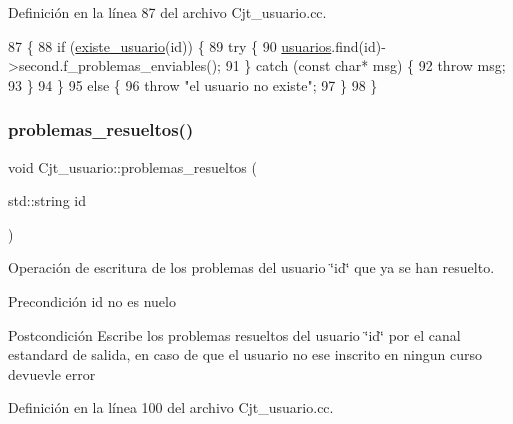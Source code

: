 Definición en la línea 87 del archivo Cjt\+\_\+usuario.\+cc.


\begin{DoxyCode}
87                                                \{
88   \textcolor{keywordflow}{if} (\mbox{\hyperlink{class_cjt__usuario_a2d4478e6b967659040f5a0b86b665204}{existe\_usuario}}(\textcolor{keywordtype}{id})) \{
89     \textcolor{keywordflow}{try} \{
90     \mbox{\hyperlink{class_cjt__usuario_af814d06f1c52bc2e744d253d20ce6e6b}{usuarios}}.find(\textcolor{keywordtype}{id})->second.f\_problemas\_enviables();
91   \} \textcolor{keywordflow}{catch} (\textcolor{keyword}{const} \textcolor{keywordtype}{char}* msg) \{
92       \textcolor{keywordflow}{throw} msg;
93   \}
94   \}
95   \textcolor{keywordflow}{else} \{
96     \textcolor{keywordflow}{throw} \textcolor{stringliteral}{"el usuario no existe"};
97   \}
98 \}
\end{DoxyCode}
\mbox{\label{class_cjt__usuario_aa1cfea5c4294317758f260033f9fbd3f}} 
\subsubsection{\texorpdfstring{problemas\+\_\+resueltos()}{problemas\_resueltos()}}
{\footnotesize\ttfamily void Cjt\+\_\+usuario\+::problemas\+\_\+resueltos (\begin{DoxyParamCaption}\item[{std\+::string}]{id }\end{DoxyParamCaption})}



Operación de escritura de los problemas del usuario \char`\"{}id\char`\"{} que ya se han resuelto. 

\begin{DoxyPrecond}{Precondición}
id no es nuelo 
\end{DoxyPrecond}
\begin{DoxyPostcond}{Postcondición}
Escribe los problemas resueltos del usuario \char`\"{}id\char`\"{} por el canal estandard de salida, en caso de que el usuario no ese inscrito en ningun curso devuevle error 
\end{DoxyPostcond}


Definición en la línea 100 del archivo Cjt\+\_\+usuario.\+cc.


